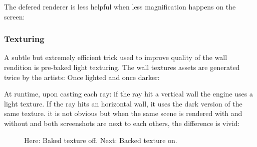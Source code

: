\begin{minipage}{\textwidth}

 \centering
\vspace*{0.5cm}

\end{minipage}



\par

\begin{minipage}{\textwidth}
 \centering
 \vspace*{0.5cm}
\end{minipage}
The defered renderer is less helpful when less magnification happens on the screen:\\






















\subsubsection{Texturing}
A subtle but extremely efficient trick used to improve quality of the wall rendition is pre-baked light texturing. The wall textures assets are generated twice by the artists: Once lighted and once darker:\\
  \begin{figure}[H]
\centering
 \end{figure}
\par
  \begin{figure}[H]
\centering
 \end{figure}
\par
At runtime, upon casting each ray: if the ray hit a vertical wall the engine uses a light texture. If the ray hits an horizontal wall, it uses the dark version of the same texture. it is not obvious but when the same scene is rendered with and without and both screenshots are next to each others, the difference is vivid:\\
\begin{minipage}{\textwidth}
\begin{figure}[H]
\centering
 \caption{Here: Baked texture off. Next: Backed texture on.}
 \end{figure}

\begin{figure}[H]
\centering
 
 \end{figure}
 \end{minipage}


